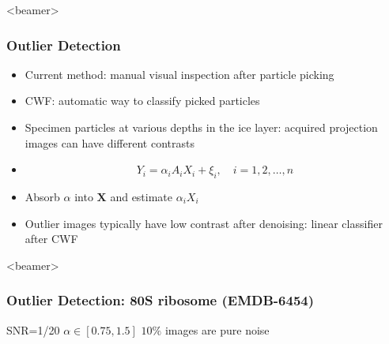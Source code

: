 \documentclass{beamer}
\begin{document}
\begin{frame}<beamer>
\frametitle{Outlier Detection}
\begin{itemize}[]
 \item  Current method: manual visual inspection after particle picking
\item CWF: automatic way to classify picked particles
\item Specimen particles at various depths in the ice layer: acquired
projection images can have different contrasts
\item 
\begin{equation*}
 Y_i = \alpha_i A_i X_i + \xi_i, \quad i=1,2,\ldots,n
\label{eqn:contrast}
\end{equation*}
\item Absorb $\alpha$ into $\textbf{X}$ and estimate $\alpha_i X_i$ 
\item  Outlier images typically have low contrast
after denoising: linear classifier
after CWF 
\end{itemize}
\end{frame}
\setcounter{subfigure}{0}
\begin{frame}<beamer>
\frametitle{Outlier Detection: 80S ribosome (EMDB-6454)}
SNR=1/20 
$\alpha \in [0.75,1.5]$
$10\%$ images are pure noise
\begin{figure}[]
\centering
{}
\quad
{} \\
\quad
{}
\end{figure}
\end{frame}
\end{document}
